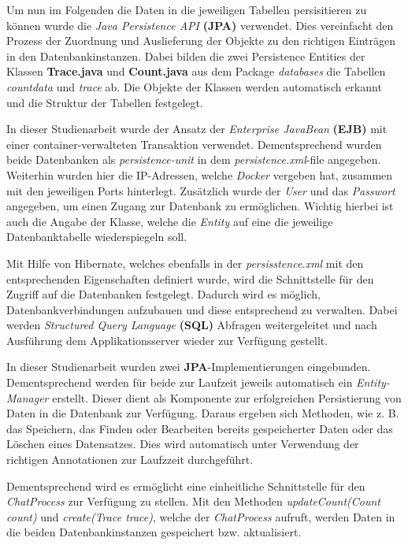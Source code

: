 \documentclass[10pt,journal,compsoc]{IEEEtran}
\begin{document}
Um nun im Folgenden die Daten in die jeweiligen Tabellen persisitieren zu können wurde die \textit{Java Persistence API} \textbf{(JPA)} verwendet. Dies vereinfacht den Prozess der Zuordnung und Auslieferung der Objekte zu den richtigen Einträgen in den Datenbankinstanzen.  Dabei bilden die zwei Persistence Entities der Klassen \textbf{Trace.java} und \textbf{Count.java} aus dem Package \textit{databases} die Tabellen \textit{countdata} und \textit{trace} ab. Die Objekte der Klassen werden automatisch erkannt und die Struktur der Tabellen festgelegt. 

In dieser Studienarbeit wurde der Ansatz der \textit{Enterprise JavaBean} \textbf{(EJB)} mit einer container-verwalteten Transaktion verwendet. Dementsprechend wurden beide Datenbanken als \textit{persistence-unit} in dem \textit{persistence.xml}-file angegeben. Weiterhin wurden hier die IP-Adressen, welche \textit{Docker} vergeben hat, zusammen mit den jeweiligen Ports hinterlegt. Zusätzlich wurde der \textit{User} und das \textit{Passwort} angegeben, um einen Zugang zur Datenbank zu ermöglichen. Wichtig hierbei ist auch die Angabe der Klasse, welche die \textit{Entity} auf eine die jeweilige Datenbanktabelle wiederspiegeln soll. 

Mit Hilfe von Hibernate, welches ebenfalls in der \textit{persisstence.xml} mit den entsprechenden Eigenschaften definiert wurde, wird die Schnittstelle für den Zugriff auf die Datenbanken festgelegt. Dadurch wird es möglich, Datenbankverbindungen aufzubauen und diese entsprechend zu verwalten. Dabei werden \textit{Structured Query Language} \textbf{(SQL)} Abfragen weitergeleitet und nach Ausführung dem Applikationsserver wieder zur Verfügung gestellt. 

In dieser Studienarbeit wurden zwei \textbf{JPA}-Implementierungen eingebunden. Dementsprechend werden für beide zur Laufzeit jeweils automatisch ein \textit{Entity-Manager} erstellt. Dieser dient als Komponente zur erfolgreichen Persistierung von Daten in die Datenbank zur Verfügung. Daraus ergeben sich Methoden, wie z. B. das Speichern, das Finden oder Bearbeiten bereits gespeicherter Daten oder das Löschen eines Datensatzes. Dies wird automatisch unter Verwendung der richtigen Annotationen zur Laufzzeit durchgeführt. 

Dementsprechend wird es ermöglicht eine einheitliche Schnittstelle für den \textit{ChatProcess} zur Verfügung zu stellen. Mit den Methoden \textit{updateCount(Count count)} und \textit{create(Trace trace)}, welche der \textit{ChatProcess} aufruft, werden Daten in die beiden Datenbankinstanzen gespeichert bzw. aktualisiert.
\end{document}
